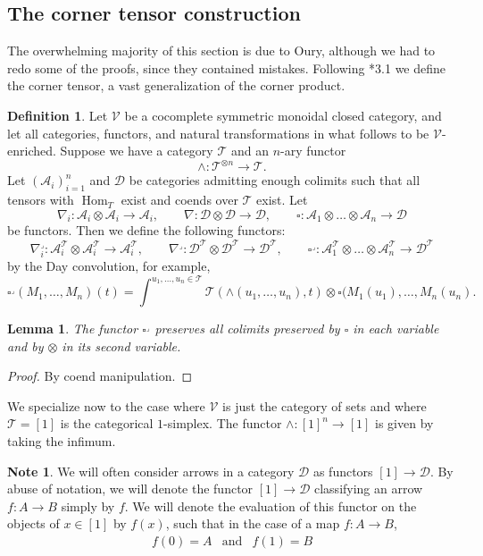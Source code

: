 \documentclass[a4paper]{article}
\numberwithin{equation}{subsection}
\theoremstyle{plain}   %
\newtheorem{lemma}[equation]{Lemma}
\theoremstyle{definition}
\newtheorem{defn}[equation]{Definition}
\newtheorem{note}[equation]{Note}
\theoremstyle{remark}
\theoremstyle{plain}
\DeclareMathOperator{\Hom}{Hom}
\begin{document}
\subsection{The corner tensor construction}\label{cornertensor} 
The overwhelming majority of this section is due to Oury, although we had to redo some of the proofs, since they contained mistakes. Following \cite{oury}*{3.1} we define the corner tensor, a vast generalization of the corner product.
\begin{defn}
	Let \(\mathcal{V}\) be a cocomplete symmetric monoidal closed category, and let all categories, functors, and natural transformations in what follows to be \(\mathcal{V}\)-enriched.  Suppose we have a category \(\mathcal{T}\) and an \(n\)-ary functor \[\wedge:\mathcal{T}^{\otimes n} \to \mathcal{T}.\]  Let \((\mathcal{A}_i)_{i=1}^n\) and \(\mathcal{D}\) be categories admitting enough colimits such that all tensors with \(\Hom_T\) exist and coends over \(\mathcal{T}\) exist.  Let
	\[\nabla_i: \mathcal{A}_i \otimes \mathcal{A}_i \to \mathcal{A}_i, \qquad \nabla:\mathcal{D}\otimes \mathcal{D} \to \mathcal{D}, \qquad \square:\mathcal{A}_1\otimes\dots \otimes \mathcal{A}_n \to \mathcal{D}\]
	be functors.  Then we define the following functors:
	\[\nabla^\lrcorner_i: \mathcal{A}^\mathcal{T}_i \otimes \mathcal{A}^\mathcal{T}_i \to \mathcal{A}_i^\mathcal{T}, \qquad \nabla^\lrcorner:\mathcal{D}^\mathcal{T}\otimes \mathcal{D}^\mathcal{T} \to \mathcal{D}^\mathcal{T}, \qquad \square^\lrcorner: \mathcal{A}_1^\mathcal{T}\otimes\dots \otimes \mathcal{A}_n^\mathcal{T} \to \mathcal{D}^\mathcal{T}\]
	by the Day convolution, for example,
	\[\square^\lrcorner(M_1,\dots,M_n)(t) = \int^{u_1,\dots,u_n \in \mathcal{T}} \mathcal{T}(\wedge(u_1,\dots,u_n),t) \otimes \square(M_1(u_1),\dots,M_n(u_n).\]
\end{defn}
\begin{lemma}
	The functor \(\square^\lrcorner\) preserves all colimits preserved by \(\square\) in each variable and by \(\otimes\) in its second variable.  
\end{lemma}
\begin{proof} By coend manipulation.
\end{proof}
We specialize now to the case where \(\mathcal{V}\) is just the category of sets and where \(\mathcal{T}=[1]\) is the categorical \(1\)-simplex.  The functor \(\wedge:[1]^n \to [1]\) is given by taking the infimum.   
\begin{note}
	We will often consider arrows in a category \(\mathcal{D}\) as functors \([1]\to \mathcal{D}\).  By abuse of notation, we will denote the functor \([1]\to \mathcal{D}\) classifying an arrow \(f:A\to B\) simply by \(f\).  We will denote the evaluation of this functor on the objects of \(x\in [1]\) by \(f(x)\), such that in the case of a map \(f:A\to B\),
	\begin{eqnarray}
		f(0) = A &\text{and}& f(1) = B
	\end{eqnarray} 
\end{note}
\end{document}
